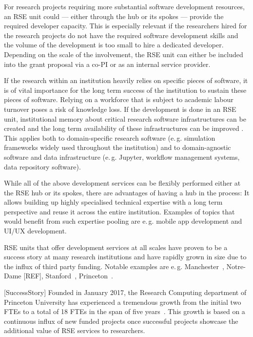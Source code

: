 \documentclass[a4paper]{article}
\makeatletter
\newcommand*{\eg}{e.\,g.\@\xspace}
\makeatother
\begin{document}
For research projects requiring more substantial software development resources, an RSE unit could --- either through the hub or its spokes --- provide the required developer capacity.
This is especially relevant if the researchers hired for the research projects do not have the required software development skills and the volume of the development is too small to hire a dedicated developer.
Depending on the scale of the involvement, the RSE unit can either be included into the grant proposal via a co-PI or as an internal service provider.

If the research within an institution heavily relies on specific pieces of software,
it is of vital importance for the long term success of the institution to sustain these pieces of software.
Relying on a workforce that is subject to academic labour turnover poses a risk of knowledge loss.
If the development is done in an RSE unit, institutional memory about critical research software infrastructures can be created and the long term availability of these infrastructures can be improved .
This applies both to domain-specific research software (\eg{} simulation frameworks widely used throughout the institution)
and to domain-agnostic software and data infrastructure (\eg{} Jupyter, workflow management systems, data repository software).

While all of the above development services can be flexibly performed either at the RSE hub or its spokes, there are advantages of having a hub in the process:
It allows building up highly specialised technical expertise with a long term perspective and reuse it across the entire institution.
Examples of topics that would benefit from such expertise pooling are \eg{} mobile app development and UI/UX development.

RSE units that offer development services at all scales have proven to be a success story at many research institutions and have rapidly grown in size due to the influx of third party funding.
Notable examples are \eg{} Manchester~\autocite{Sinclair2022}, Notre-Dame [REF], Stanford~\autocite{Stanford2023}, Princeton~\autocite{Cosden2022a}.

[SuccessStory]
Founded in January 2017, the Research Computing department of Princeton University has experienced a tremendous growth from the initial two FTEs to a total of 18 FTEs in the span of five years~\autocite{Cosden2022a}.
This growth is based on a continuous influx of new funded projects once successful projects showcase the additional value of RSE services to researchers.
\end{document}
